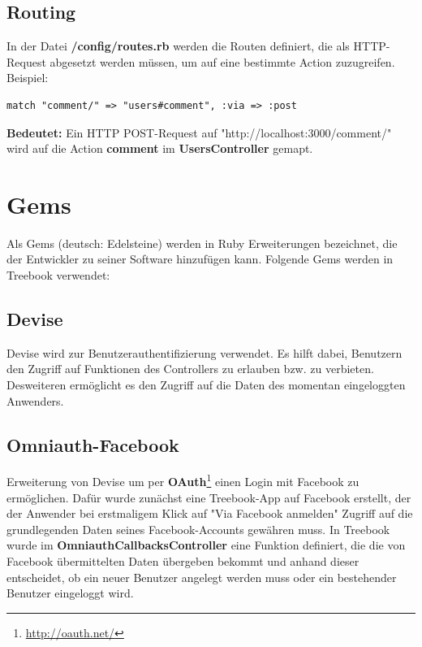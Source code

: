 \documentclass[10pt,a4paper]{book}
\begin{document}
\subsection{Routing}
In der Datei \textbf{/config/routes.rb} werden die Routen definiert, die als HTTP-Request abgesetzt werden müssen, um auf eine bestimmte Action zuzugreifen.
Beispiel:
\begin{lstlisting}
match "comment/" => "users#comment", :via => :post
\end{lstlisting}
\textbf{Bedeutet:} Ein HTTP POST-Request auf "http://localhost:3000/comment/" wird auf die Action \textbf{comment} im \textbf{UsersController} gemapt.
\section{Gems}
Als Gems (deutsch: Edelsteine) werden in Ruby Erweiterungen bezeichnet, die der Entwickler zu seiner Software hinzufügen kann. Folgende Gems werden in Treebook verwendet:
\subsection{Devise}
Devise wird zur Benutzerauthentifizierung verwendet. Es hilft dabei, Benutzern den Zugriff auf Funktionen des Controllers zu erlauben bzw. zu verbieten. Desweiteren ermöglicht es den Zugriff auf die Daten des momentan eingeloggten Anwenders.
\subsection{Omniauth-Facebook}
Erweiterung von Devise um per \textbf{OAuth}\footnote{\href{http://oauth.net/}{http://oauth.net/}} einen Login mit Facebook zu ermöglichen. 
Dafür wurde zunächst eine Treebook-App auf Facebook erstellt, der der Anwender bei erstmaligem Klick auf "Via Facebook anmelden" Zugriff auf 
die grundlegenden Daten seines Facebook-Accounts gewähren muss. In Treebook wurde im \textbf{OmniauthCallbacksController} eine Funktion 
definiert, die die von Facebook übermittelten Daten übergeben bekommt und anhand dieser entscheidet, ob ein neuer Benutzer angelegt werden muss oder ein bestehender Benutzer eingeloggt wird.
\end{document}

